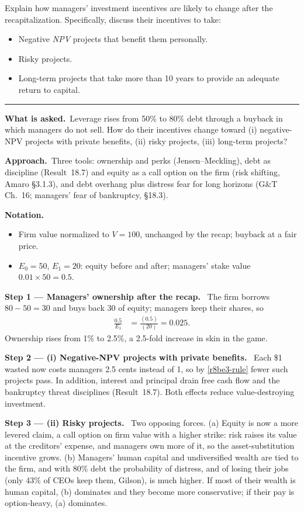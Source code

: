 \documentclass[11pt,a4paper]{article}
\newcommand{\notation}{\par\noindent\textbf{Notation.}}
\newcommand{\step}[2]{\par\medskip\noindent\textbf{Step #1 --- #2.}~}
\newcommand{\asked}{\par\medskip\noindent\textbf{What is asked.}~}
\newcommand{\approach}{\par\smallskip\noindent\textbf{Approach.}~}
\providecommand{\tightlist}{\setlength{\itemsep}{0pt}\setlength{\parskip}{0pt}}
\newcommand{\stmtend}{\par\endgroup\nopagebreak\noindent\rule{\linewidth}{0.4pt}\par\medskip}
\begin{document}
Explain how managers' investment incentives are likely to change after the recapitalization.
Specifically, discuss their incentives to take:

\begin{itemize}
\tightlist
\item
  Negative \emph{NPV} projects that benefit them personally.
\item
  Risky projects.
\item
  Long-term projects that take more than 10 years to provide an adequate return to capital.
\end{itemize}
\stmtend

\asked Leverage rises from 50\% to 80\% debt through a buyback in which managers do not sell. How do their incentives change toward (i) negative-NPV projects with private benefits, (ii) risky projects, (iii) long-term projects?

\approach Three tools: ownership and perks (Jensen--Meckling), debt as discipline (Result~18.7) and equity as a call option on the firm (risk shifting, Amaro \S3.1.3), and debt overhang plus distress fear for long horizons (G\&T Ch.~16; managers' fear of bankruptcy, \S18.3).

\notation
\begin{itemize}
  \item Firm value normalized to $V=100$, unchanged by the recap; buyback at a fair price.
  \item $E_0=50$, $E_1=20$: equity before and after; managers' stake value $0.01\times50=0.5$.
\end{itemize}

\step{1}{Managers' ownership after the recap} The firm borrows $80-50=30$ and buys back 30 of equity; managers keep their shares, so
\begin{align}
  \frac{0.5}{E_1} &= \frac{(0.5)}{(20)} = 0.025. \label{r8be9-own}
\end{align}
Ownership rises from 1\% to 2.5\%, a 2.5-fold increase in skin in the game.

\step{2}{(i) Negative-NPV projects with private benefits} Each \$1 wasted now costs managers 2.5 cents instead of 1, so by \eqref{r8be3-rule} fewer such projects pass. In addition, interest and principal drain free cash flow and the bankruptcy threat disciplines (Result~18.7). Both effects reduce value-destroying investment.

\step{3}{(ii) Risky projects} Two opposing forces. (a) Equity is now a more levered claim, a call option on firm value with a higher strike: risk raises its value at the creditors' expense, and managers own more of it, so the asset-substitution incentive grows. (b) Managers' human capital and undiversified wealth are tied to the firm, and with 80\% debt the probability of distress, and of losing their jobs (only 43\% of CEOs keep them, Gilson), is much higher. If most of their wealth is human capital, (b) dominates and they become more conservative; if their pay is option-heavy, (a) dominates.
\end{document}
